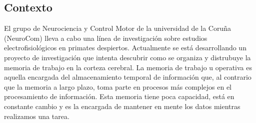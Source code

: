 \documentclass[conference]{IEEEtran}
\begin{document}
\subsection{Contexto}






















El grupo de Neurociencia y Control Motor de la universidad de la Coruña (NeuroCom) lleva a cabo una línea de investigación sobre estudios electrofisiológicos en primates despiertos\cite{neurocom1}\cite{neurocom2}. Actualmente se está desarrollando un proyecto de investigación que intenta descubrir como se organiza y distrubuye la memoria de trabajo en la corteza cerebral. La memoria de trabajo u operativa es aquella encargada del almacenamiento temporal de información que, al contrario que la memoria a largo plazo, toma parte en procesos más complejos en el procesamiento de información. Esta memoria tiene poca capacidad, está en constante cambio y es la encargada de mantener en mente los datos mientras realizamos una tarea.
\end{document}
